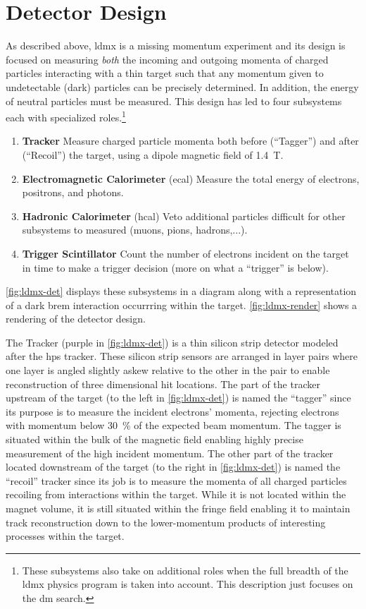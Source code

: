 \section{Detector Design}
As described above, \ac{ldmx} is a missing momentum experiment and its design is focused on
measuring \emph{both} the incoming and outgoing momenta of charged particles interacting with a
thin target such that any momentum given to undetectable (dark) particles can be precisely
determined. In addition, the energy of neutral particles must be measured. This design has led to
four subsystems each with specialized roles.\footnote{ These subsystems also take on additional
  roles when the full breadth of the \ac{ldmx} physics program is taken into account. This
  description just focuses on the \ac{dm} search. }
\begin{enumerate}
  \item \textbf{Tracker} Measure charged particle momenta both before (``Tagger'') and after
    (``Recoil'') the target, using a dipole magnetic field of \qty{1.4}{\tesla}.
  \item \textbf{Electromagnetic Calorimeter} (\ac{ecal}) Measure the total energy of electrons, positrons, and photons.
  \item \textbf{Hadronic Calorimeter} (\acs{hcal}) Veto additional particles difficult for other subsystems to measured (muons, pions, hadrons,...).
  \item \textbf{Trigger Scintillator} Count the number of electrons incident on the target in time to make a trigger decision (more on what a ``trigger'' is below).
\end{enumerate}
\cref{fig:ldmx-det} displays these subsystems in a diagram along with a representation of
a dark brem interaction occurrring within the target. \cref{fig:ldmx-render} shows a rendering
of the detector design.

The Tracker (purple in \cref{fig:ldmx-det}) is a thin silicon strip detector modeled after the
\ac{hps} tracker. These silicon strip sensors are arranged in layer pairs where one layer is angled
slightly askew relative to the other in the pair to enable reconstruction of three dimensional hit
locations. The part of the tracker upstream of the target (to the left in \cref{fig:ldmx-det}) is
named the ``tagger'' since its purpose is to measure the incident electrons' momenta, rejecting
electrons with momentum below \qty{30}{\percent} of the expected beam momentum. The tagger is
situated within the bulk of the magnetic field enabling highly precise measurement of the high incident
momentum. The other part of the tracker located downstream of the target (to the right in
\cref{fig:ldmx-det}) is named the ``recoil'' tracker since its job is to measure the momenta of all
charged particles recoiling from interactions within the target. While it is not located within the
magnet volume, it is still situated within the fringe field enabling it to maintain track reconstruction
down to the lower-momentum products of interesting processes within the target.

